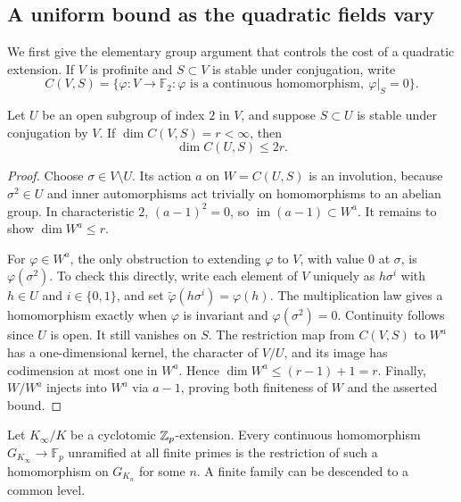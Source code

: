 \subsection{A uniform bound as the quadratic fields vary}

We first give the elementary group argument that controls the cost
of a quadratic extension. If $V$ is profinite and $S\subset V$ is
stable under conjugation, write
\[
 C(V,S)=\{\varphi:V\to\mathbb F_2:
       \varphi\text{ is a continuous homomorphism},\ 
       \varphi|_S=0\}.
\]

\begin{lemma}
\label{ct-index-two}
Let $U$ be an open subgroup of index $2$ in $V$, and suppose
$S\subset U$ is stable under conjugation by $V$. If
$\dim C(V,S)=r<\infty$, then
\[
                 \dim C(U,S)\le 2r.
\]
\end{lemma}

\begin{proof}
Choose $\sigma\in V\setminus U$. Its action $a$ on
$W=C(U,S)$ is an involution, because $\sigma^2\in U$ and inner
automorphisms act trivially on homomorphisms to an abelian group.
In characteristic $2$, $(a-1)^2=0$, so
$\operatorname{im}(a-1)\subset W^a$. It remains to show
$\dim W^a\le r$.

For $\varphi\in W^a$, the only obstruction to extending
$\varphi$ to $V$, with value $0$ at $\sigma$, is
$\varphi(\sigma^2)$. To check this directly, write each element
of $V$ uniquely as $h\sigma^i$ with $h\in U$ and $i\in\{0,1\}$,
and set $\widetilde\varphi(h\sigma^i)=\varphi(h)$.
The multiplication law gives a homomorphism exactly when
$\varphi$ is invariant and $\varphi(\sigma^2)=0$.
Continuity follows since $U$ is open. It still vanishes on $S$.
The restriction map from $C(V,S)$ to $W^a$ has a one-dimensional
kernel, the character of $V/U$, and its image has codimension at
most one in $W^a$. Hence $\dim W^a\le(r-1)+1=r$.
Finally, $W/W^a$ injects into $W^a$ via $a-1$, proving both
finiteness of $W$ and the asserted bound.
\end{proof}

\begin{lemma}
\label{ct-character-descent}
Let $K_\infty/K$ be a cyclotomic $\mathbb Z_p$-extension.
Every continuous homomorphism
$G_{K_\infty}\to\mathbb F_p$ unramified at all finite primes
is the restriction of such a homomorphism on $G_{K_n}$ for some
$n$. A finite family can be descended to a common level.
\end{lemma}

